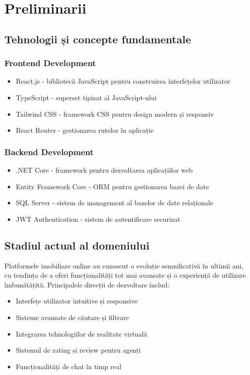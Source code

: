 \documentclass[12pt,a4paper]{report}
\begin{document}
\chapter{Preliminarii}
\section{Tehnologii și concepte fundamentale}
\subsection{Frontend Development}
\begin{itemize}
    \item React.js - bibliotecă JavaScript pentru construirea interfețelor utilizator
    \item TypeScript - superset tipizat al JavaScript-ului
    \item Tailwind CSS - framework CSS pentru design modern și responsiv
    \item React Router - gestionarea rutelor în aplicație
\end{itemize}

\subsection{Backend Development}
\begin{itemize}
    \item .NET Core - framework pentru dezvoltarea aplicațiilor web
    \item Entity Framework Core - ORM pentru gestionarea bazei de date
    \item SQL Server - sistem de management al bazelor de date relaționale
    \item JWT Authentication - sistem de autentificare securizat
\end{itemize}

\section{Stadiul actual al domeniului}
Platformele imobiliare online au cunoscut o evoluție semnificativă în ultimii ani, cu tendința de a oferi funcționalități tot mai avansate și o experiență de utilizare îmbunătățită. Principalele direcții de dezvoltare includ:
\begin{itemize}
    \item Interfețe utilizator intuitive și responsive
    \item Sisteme avansate de căutare și filtrare
    \item Integrarea tehnologiilor de realitate virtuală
    \item Sistemul de rating și review pentru agenți
    \item Funcționalități de chat în timp real
\end{itemize}
\end{document}
